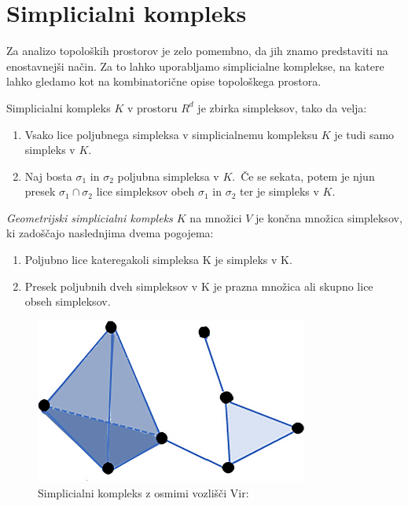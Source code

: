 \section{Simplicialni kompleks}
Za analizo topoloških prostorov je zelo pomembno, da jih znamo predstaviti na enostavnejši način. Za to lahko uporabljamo simplicialne komplekse, na katere lahko gledamo kot na kombinatorične opise topološkega prostora.

\begin{definicija}
  Simplicialni kompleks \(K\) v prostoru \(R^d\) je zbirka simpleksov, tako da velja:
      \begin{enumerate}
      \item Vsako lice poljubnega simpleksa v simplicialnemu kompleksu \(K\) je tudi samo simpleks v \(K\).
      \item Naj bosta \(\sigma_1\) in \(\sigma_2\) poljubna simpleksa v \(K\).\ \v{C}e se sekata, potem je njun presek \(\sigma_1 \cap \sigma_2\) lice simpleksov obeh \(\sigma_1\) in \(\sigma_2\) ter je simpleks v \(K\).
  \end{enumerate}
\end{definicija}

\begin{definicija}
  \textit{Geometrijski simplicialni kompleks $K$} na množici $V$ je končna množica simpleksov, ki zadoščajo naslednjima dvema pogojema:
  \begin{enumerate}
      \item Poljubno lice kateregakoli simpleksa K je simpleks v K.
      \item Presek poljubnih dveh simpleksov v K je prazna množica ali skupno lice obseh simpleksov.
  \end{enumerate}
\end{definicija}

\begin{figure}[H]
  \centering
  \includegraphics[width=0.8\textwidth]{resources/Simplicial-complex-eight-vertices.png}
  \caption{Simplicialni kompleks z osmimi vozlišči Vir:~\cite{researchgate_simplicial_complex}}\label{fig:your-label3}
\end{figure}

